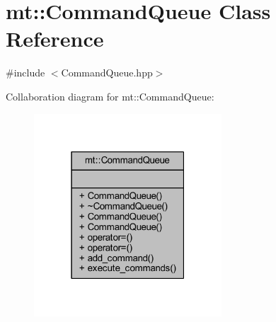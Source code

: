 \hypertarget{classmt_1_1_command_queue}{}\section{mt\+:\+:Command\+Queue Class Reference}
\label{classmt_1_1_command_queue}


{\ttfamily \#include $<$Command\+Queue.\+hpp$>$}



Collaboration diagram for mt\+:\+:Command\+Queue\+:\nopagebreak
\begin{figure}[H]
\begin{center}
\leavevmode
\includegraphics[width=199pt]{classmt_1_1_command_queue__coll__graph}
\end{center}
\end{figure}
